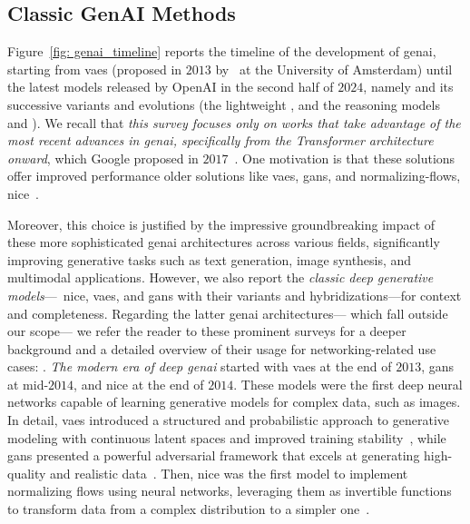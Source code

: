 \subsection{Classic GenAI Methods}
\label{subsec:classic_ai}
%
Figure~\ref{fig: genai_timeline} reports the timeline of the development of \gls{genai}, starting from \glspl{vae} (proposed in $2013$ by~\citet{kingma2013auto} at the University of Amsterdam) until the latest models released by OpenAI in the second half of $2024$, namely  and its successive variants and evolutions (\ie the lightweight , and the reasoning models  and ).
%
We recall that \emph{this survey focuses only on works that take advantage of the most recent advances in \gls{genai}, specifically from the Transformer architecture onward}, which Google proposed in $2017$~\cite{vaswani2017attention}.
One motivation is that these solutions offer improved performance \wrt older solutions like \glspl{vae}, \glspl{gan}, and normalizing-flows, \eg \gls{nice}~\cite{dinh2014nice}.

Moreover, this choice is justified by the impressive groundbreaking impact of 
these more sophisticated \gls{genai} architectures
across various fields,
%    
significantly improving 
%
generative tasks such as text generation, image synthesis, and multimodal applications.
However, we also report the \emph{classic deep generative models}---\viz~\gls{nice}, \glspl{vae}, and \glspl{gan} with their variants and hybridizations---for context and completeness.
Regarding the latter \gls{genai} architectures---%
which fall outside our scope---%
we refer the reader to these prominent surveys for a deeper background and a detailed overview of their usage for networking-related use cases: \cite{adeleke2022network, sai2024empowering, halvorsen2024applying, karapantelakis2024generative}.
\emph{The modern era of deep \gls{genai}} started with \glspl{vae} at the end of $2013$, \glspl{gan} at mid-$2014$, and \gls{nice} at the end of $2014$.
These models were the first deep neural networks capable of learning generative models for complex data, such as images.
In detail, \glspl{vae} introduced a structured and probabilistic approach to generative modeling with continuous latent spaces and improved training stability~\cite{kingma2013auto},
while \glspl{gan} presented a powerful adversarial framework that excels at generating high-quality and realistic data~\cite{goodfellow2014generative}.
Then, \gls{nice} was the first model to implement normalizing flows using neural networks, leveraging them as invertible functions to transform data from a complex distribution to a simpler one~\cite{dinh2014nice}.

